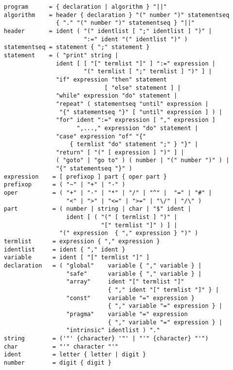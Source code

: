 \begin{table}
\begin{center}{\small
\begin{verbatim}
program      = { declaration | algorithm } "||"
algorithm    = header { declaration } "(" number ")" statementseq 
               { "." "(" number ")" statementseq } "||" 
header       = ident ( "(" identlist [ ";" identlist ] ")" |
                       ":=" ident "(" identlist ")" )
statementseq = statement { ";" statement }
statement    = ( "print" string | 
               ident [ [ "[" termlist "]" ] ":=" expression |
                       "(" termlist [ ";" termlist ] ")" ] |
               "if" expression "then" statement 
                             [ "else" statement ] |
               "while" expression "do" statement |
               "repeat" ( statementseq "until" expression | 
                "{" statementseq "}" [ "until" expression ] ) |
               "for" ident ":=" expression [ "," expression ] 
                     ",...," expression "do" statement | 
               "case" expression "of" "{" 
                   { termlist "do" statement ";" } "}" |
               "return" [ "(" [ expression ] ")" ] | 
               ( "goto" | "go to" ) ( number | "(" number ")" ) |
               "{" statementseq "}" )
expression    = [ prefixop ] part { oper part }
prefixop      = ( "~" | "+" | "-" )
oper          = ( "+" | "-" | "*" | "/" | "^" |  "=" | "#" | 
                  "<" | ">" | "<=" | ">=" | "\/" | "/\" )
part          = ( number | string | char | "$" ident |
                  ident [ ( "(" [ termlist ] ")" | 
                            "[" termlist "]" ) ] |
                "(" expression  { "," expression } ")" )
termlist      = expression { "," expression }
identlist     = ident { "," ident }
variable      = ident [ "[" termlist "]" ]
declaration   = ( "global"    variable { "," variable } |
                  "safe"      variable { "," variable } | 
                  "array"     ident "[" termlist "]" 
                              { "," ident "[" termlist "]" } |
                  "const"     variable "=" expression }  
                              { "," variable "=" expression } | 
                  "pragma"    variable "=" expression 
                              { "," variable "=" expression } | 
                  "intrinsic" identlist ) "."
string        = ('"' {character} '"' | "'" {character} "'")
char          = "'" character "'"
ident         = letter { letter | digit }
number        = digit { digit }
\end{verbatim}
}\end{center}
\label{tabSDA}
\caption{ALDES Syntax Diagram}
\end{table}

